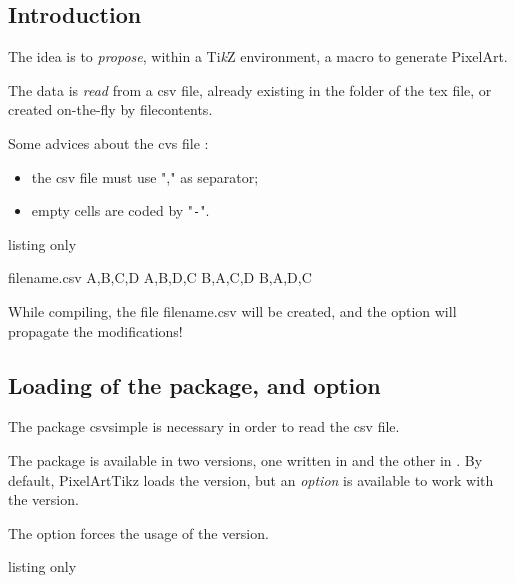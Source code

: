 \documentclass{article}
\newcommand\Cle[1]{{\bfseries\sffamily\textlangle #1\textrangle}}
\begin{document}
\subsection{Introduction}

The idea is to \textit{propose}, within a Ti\textit{k}Z environment, a macro to generate PixelArt.

The data is \textit{read} from a \textsf{csv} file, already existing in the folder of the \textsf{tex} file, or created on-the-fly by \textsf{filecontents}.

\medskip

Some advices about the \textsf{cvs} file :

\begin{itemize}
	\item the \textsf{csv} file must use "," as separator;
	\item empty cells are coded by "\texttt{-}".
\end{itemize}

\begin{PresentationCode}{listing only}
\begin{filecontents*}{filename.csv}
	A,B,C,D
	A,B,D,C
	B,A,C,D
	B,A,D,C
\end{filecontents*}
\end{PresentationCode}

While compiling, the file \textsf{filename.csv} will be created, and the option \Cle{[overwrite]} will propagate the modifications!

\subsection{Loading of the package, and option}

The package \textsf{csvsimple} is necessary in order to read the \textsf{csv} file.

The package is available in two versions, one written in  and the other in . By default, \textsf{PixelArtTikz} loads the  version, but an \textit{option} is available to work with the  version.

\smallskip

The option \Cle{[csvii]} forces the usage of the  version.

\begin{PresentationCode}{listing only}
\usepackage{PixelArtTikz}                     %

\usepackage[csvii]{PixelArtTikz}              %
\end{PresentationCode}
\end{document}
